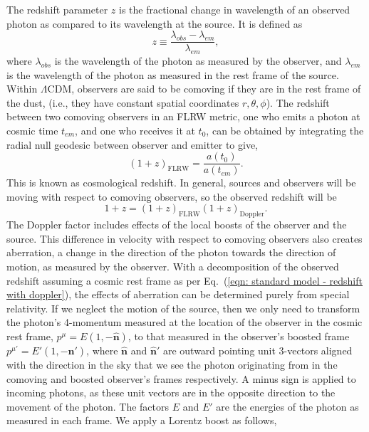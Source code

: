 \documentclass[a4paper,12pt]{report}
\newcommand{\uvec}[1]{\hat{\bm{#1}}}
\renewcommand{\eqref}[1]{Eq.~({#1})}
\begin{document}
The redshift parameter $z$ is the fractional change in wavelength of an observed photon as compared to its wavelength at the source. It is defined as
\begin{equation}
  z \equiv \frac{\lambda_{obs}-\lambda_{em}}{\lambda_{em}},
\end{equation}
where $\lambda_{obs}$ is the wavelength of the photon as measured by the observer, and $\lambda_{em}$ is the wavelength of the photon as measured in the rest frame of the source. Within $\Lambda$CDM, observers are said to be comoving if they are in the rest frame of the dust, (i.e., they have constant spatial coordinates $r,\theta,\phi$). The redshift between two comoving observers in an FLRW metric, one who emits a photon at cosmic time $t_{em}$, and one who receives it at $t_0$, can be obtained by integrating the radial null geodesic between observer and emitter to give,
\begin{equation}\label{eqn: standard model - cosmological redshift}
  (1+z)_{\text{FLRW}}=\frac{a(t_0)}{a(t_{em})}.
\end{equation}
This is known as cosmological redshift. In general, sources and observers will be moving with respect to comoving observers, so the observed redshift will be
\begin{equation} \label{eqn: standard model - redshift with doppler}
  1+z = (1+z)_{\text{FLRW}} (1+z)_{\text{Doppler}}.
\end{equation}
The Doppler factor includes effects of the local boosts of the observer and the source. This difference in velocity with respect to comoving observers also creates aberration, a change in the direction of the photon towards the direction of motion, as measured by the observer. With a decomposition of the observed redshift assuming a cosmic rest frame as per \eqref{\ref{eqn: standard model - redshift with doppler}}, the effects of aberration can be determined purely from special relativity. If we neglect the motion of the source, then we only need to transform the photon's 4-momentum measured at the location of the observer in the cosmic rest frame, $p^{\mu} = E(1,-\uvec{n})$, to that measured in the observer's boosted frame $p^{\mu'}=E'(1,-\uvec{n}')$, where $\uvec{n}$ and $\uvec{n}'$ are outward pointing unit 3-vectors aligned with the direction in the sky that we see the photon originating from in the comoving and boosted observer's frames respectively. A minus sign is applied to incoming photons, as these unit vectors are in the opposite direction to the movement of the photon. The factors $E$ and $E'$ are the energies of the photon as measured in each frame. We apply a Lorentz boost as follows,
\end{document}
